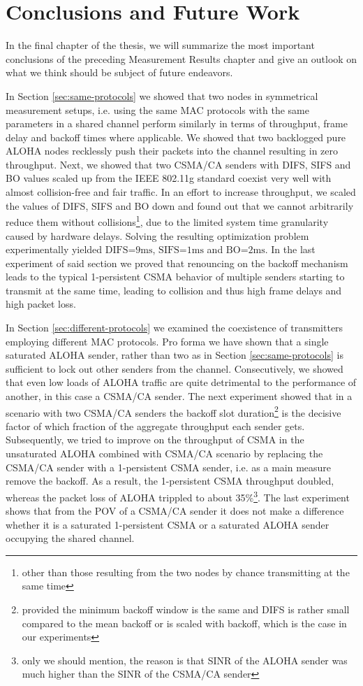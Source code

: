 \chapter{Conclusions and Future Work}
\label{ch:conclusions}

In the final chapter of the thesis, we will summarize the most important conclusions of the preceding Measurement Results chapter and give an outlook on what we think should be subject of future endeavors.

In Section \ref{sec:same-protocols} we showed that two nodes in symmetrical measurement setups, i.e. using the same MAC protocols with the same parameters in a shared channel perform similarly in terms of throughput, frame delay and backoff times where applicable. We showed that two backlogged pure ALOHA nodes recklessly push their packets into the channel resulting in zero throughput. Next, we showed that two CSMA/CA senders with DIFS, SIFS and BO values scaled up from the IEEE 802.11g standard coexist very well with almost collision-free and fair traffic. In an effort to increase throughput, we scaled the values of DIFS, SIFS and BO down and found out that we cannot arbitrarily reduce them without collisions\footnote{other than those resulting from the two nodes by chance transmitting at the same time}, due to the limited system time granularity caused by hardware delays. Solving the resulting optimization problem experimentally yielded $\text{DIFS=9ms}$, $\text{SIFS=1ms}$ and $\text{BO=2ms}$. In the last experiment of said section we proved that renouncing on the backoff mechanism leads to the typical 1-persistent CSMA behavior of multiple senders starting to transmit at the same time, leading to collision and thus high frame delays and high packet loss.

In Section \ref{sec:different-protocols} we examined the coexistence of transmitters employing different MAC protocols. Pro forma we have shown that a single saturated ALOHA sender, rather than two as in Section \ref{sec:same-protocols} is sufficient to lock out other senders from the channel. Consecutively, we showed that even low loads of ALOHA traffic are quite detrimental to the performance of another, in this case a CSMA/CA sender. The next experiment showed that in a scenario with two CSMA/CA senders the backoff slot duration\footnote{provided the minimum backoff window is the same and DIFS is rather small compared to the mean backoff or is scaled with backoff, which is the case in our experiments} is the decisive factor of which fraction of the aggregate throughput each sender gets. Subsequently, we tried to improve on the throughput of CSMA in the unsaturated ALOHA combined with CSMA/CA scenario by replacing the CSMA/CA sender with a 1-persistent CSMA sender, i.e. as a main measure remove the backoff. As a result, the 1-persistent CSMA throughput doubled, whereas the packet loss of ALOHA trippled to about 35\%\footnote{only we should mention, the reason is that SINR of the ALOHA sender was much higher than the SINR of the CSMA/CA sender}. The last experiment shows that from the POV of a CSMA/CA sender it does not make a difference whether it is a saturated 1-persistent CSMA or a saturated ALOHA sender occupying the shared channel.    


